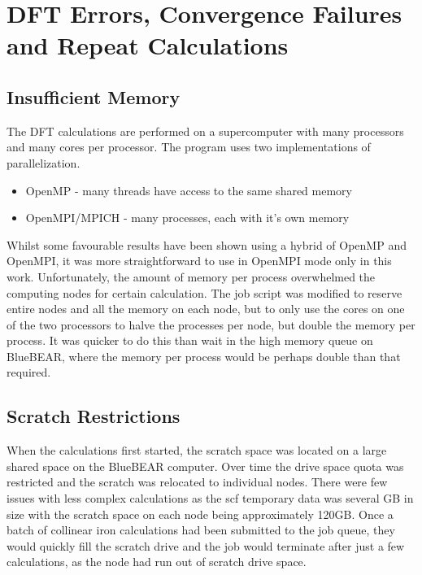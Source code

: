 

\section[Issues to Overcome]{DFT Errors, Convergence Failures and Repeat Calculations}

\subsection{Insufficient Memory}

The DFT calculations are performed on a supercomputer with many processors and many cores per processor.  The program uses two implementations of parallelization.

\begin{itemize}
\item OpenMP - many threads have access to the same shared memory
\item OpenMPI/MPICH - many processes, each with it's own memory
\end{itemize}

Whilst some favourable results have been shown using a hybrid of OpenMP and OpenMPI, it was more straightforward to use in OpenMPI mode only in this work.  Unfortunately, the amount of memory per process overwhelmed the computing nodes for certain calculation.  The job script was modified to reserve entire nodes and all the memory on each node, but to only use the cores on one of the two processors to halve the processes per node, but double the memory per process.  It was quicker to do this than wait in the high memory queue on BlueBEAR, where the memory per process would be perhaps double than that required.

\subsection{Scratch Restrictions}

When the calculations first started, the scratch space was located on a large shared space on the BlueBEAR computer.  Over time the drive space quota was restricted and the scratch was relocated to individual nodes.  There were few issues with less complex calculations as the \acrshort{scf} temporary data was several GB in size with the scratch space on each node being approximately 120GB.  Once a batch of collinear iron calculations had been submitted to the job queue, they would quickly fill the scratch drive and the job would terminate after just a few calculations, as the node had run out of scratch drive space.

